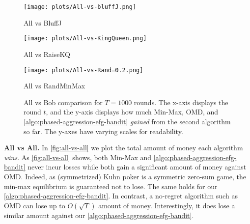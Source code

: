 \documentclass[11pt]{article}
\begin{document}
\begin{figure*}[ht]
    \centering
    \begin{minipage}{1.0\textwidth}
    \begin{minipage}{0.05\textwidth}
        
    \end{minipage}
    \begin{minipage}{0.25\textwidth}
        \centering
        \texttt{[image: plots/All-vs-bluffJ.png]}
        \caption*{All vs BluffJ}
    \end{minipage}
    \begin{minipage}{0.25\textwidth}
        \centering
        \texttt{[image: plots/All-vs-KingQueen.png]}
        \caption*{All vs RaiseKQ}
    \end{minipage}
    \begin{minipage}{0.25\textwidth}
        \centering
        \texttt{[image: plots/All-vs-Rand=0.2.png]}
        \caption*{All vs RandMinMax}
    \end{minipage}
    \begin{minipage}{0.05\textwidth}
        
    \end{minipage}
    \begin{minipage}{1.0\textwidth}
    \centering
    \caption{All vs Bob comparison for $T=1000$ rounds. The x-axis displays the round $t$, and the y-axis displays how much {\color{mblue}Min-Max}, {\color{mred}OMD}, and {\color{mgreen}\cref{algo:phased-aggression-efg-bandit}} \emph{gained} from the second algorithm so far. The y-axes have varying scales for readability.}\label{fig:all-vs-x}
    \end{minipage}
    \end{minipage}
\end{figure*}

\textbf{All vs All.} In \cref{fig:all-vs-all} we plot the total amount of money each algorithm \emph{wins}. As \cref{fig:all-vs-all} shows, both Min-Max and \cref{algo:phased-aggression-efg-bandit} never incur losses while both gain a significant amount of money against OMD. Indeed, as (symmetrized) Kuhn poker is a symmetric zero-sum game, the min-max equilibrium is guaranteed not to lose. The same holds for our \cref{algo:phased-aggression-efg-bandit}. In contrast, a no-regret algorithm such as OMD can lose up to $O(\sqrt{T})$ amount of money. Interestingly, it does lose a similar amount against our \cref{algo:phased-aggression-efg-bandit}.
\end{document}

